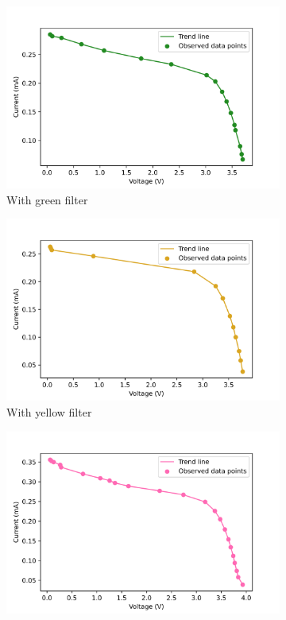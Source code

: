 \documentclass[%
 aip,
 amsmath,amssymb,
 reprint, floatfix%
]{revtex4-2}
\begin{document}
\begin{figure}
\begin{subfigure}[b]{0.49\textwidth}
            \includegraphics[scale = 0.54]{Figures/plot-iv-lamp-green.png}
            \caption{With green filter}
            \label{fig:iv-lamp-green}
        \end{subfigure}
        \hfill
        \begin{subfigure}[b]{0.49\textwidth}
            \centering
            \includegraphics[scale = 0.54]{Figures/plot-iv-lamp-yellow.png}
            \caption{With yellow filter}
            \label{fig:iv-lamp-yellow}
        \end{subfigure}
        \hfill
        \begin{subfigure}[b]{0.49\textwidth}
            \centering
            \includegraphics[scale = 0.54]{Figures/plot-iv-lamp-pink.png}

\end{subfigure}
\end{figure}
\end{document}
